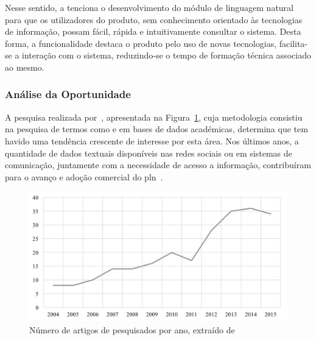 Nesse sentido, a {\companyname} tenciona o desenvolvimento do módulo de linguagem natural para que os utilizadores do produto, sem conhecimento orientado às tecnologias de informação, possam fácil, rápida e intuitivamente consultar o sistema. Desta forma, a funcionalidade destaca o produto pelo uso de novas tecnologias, facilita-se a interação com o sistema, reduzindo-se o tempo de formação técnica associado ao mesmo. 

\subsubsection{Análise da Oportunidade}

A pesquisa realizada por~\textcite{roadmap_nlp_research_is}, apresentada na Figura~\ref{fig:number_articles_per_year_nlp}, cuja metodologia consistiu na pesquisa de termos como  e  em bases de dados académicas, determina que tem havido uma tendência crescente de interesse por esta área. Nos últimos anos, a quantidade de dados textuais disponíveis nas redes sociais ou em sistemas de comunicação, juntamente com a necessidade de acesso a informação, contribuíram para o avanço e adoção comercial do \gls{pln}~\parencite{roadmap_nlp_research_is}.

\begin{figure}[!ht]
    \centering
    \includegraphics[width=.9\textwidth]{ch02/assets/number_articles_nlp.jpg}
    \caption{Número de artigos de  pesquisados por ano, extraído de~\textcite{roadmap_nlp_research_is}}
    \label{fig:number_articles_per_year_nlp}
\end{figure}

